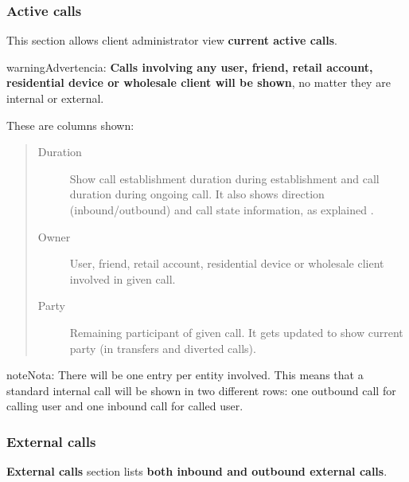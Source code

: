 \documentclass[letterpaper,10pt,spanish]{sphinxmanual}
\begin{document}
\subsubsection{Active calls}
\label{administration_portal/client/vpbx/calls/active_calls::doc}\label{administration_portal/client/vpbx/calls/active_calls:active-calls}
This section allows client administrator view \textbf{current active calls}.

\begin{notice}{warning}{Advertencia:}
\textbf{Calls involving any user, friend, retail account, residential device or wholesale client will be shown},
no matter they are internal or external.
\end{notice}

These are columns shown:
\begin{quote}
\begin{description}
\item[{Duration}] \leavevmode
Show call establishment duration during establishment and call duration during ongoing call. It also shows
direction (inbound/outbound) and call state information, as explained {\hyperref[administration_portal/platform/active_calls:call\string-state]{}}.

\item[{Owner}] \leavevmode
User, friend, retail account, residential device or wholesale client involved in given call.

\item[{Party}] \leavevmode
Remaining participant of given call. It gets updated to show current party (in transfers and diverted calls).

\end{description}
\end{quote}

\begin{notice}{note}{Nota:}
There will be one entry per entity involved. This means that a standard internal call will be shown
in two different rows: one outbound call for calling user and one inbound call for called user.
\end{notice}


\subsubsection{External calls}
\label{administration_portal/client/vpbx/calls/external_calls::doc}\label{administration_portal/client/vpbx/calls/external_calls:external-calls}
\textbf{External calls} section lists \textbf{both inbound and outbound external calls}.
\end{document}
